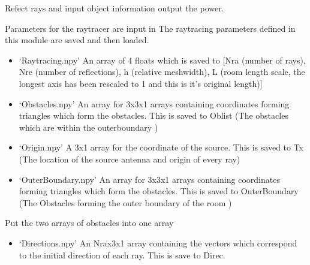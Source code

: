 \documentclass[letterpaper,10pt,english]{sphinxmanual}
\begin{document}
\begin{fulllineitems}
\label{\detokenize{index:RayTracerMainProgram.StdProgram}}
Refect rays and input object information output the power.

Parameters for the raytracer are input in {\hyperref[\detokenize{index:module-ParameterInput}]{}}
The raytracing parameters defined in this module are saved and then loaded.
\begin{itemize}
\item {} 
‘Raytracing.npy’ \sphinxhyphen{} An array of 4 floats which is saved to   {[}Nra (number of rays), Nre (number of reflections),   h (relative meshwidth),   L (room length scale, the longest axis has been rescaled to 1 and this   is it’s original length){]}

\item {} 
‘Obstacles.npy’  \sphinxhyphen{} An array for 3x3x1 arrays containing co\sphinxhyphen{}ordinates   forming triangles which form the obstacles. This is saved to Oblist   (The obstacles which are within the outerboundary )

\item {} 
‘Origin.npy’     \sphinxhyphen{} A 3x1 array for the co\sphinxhyphen{}ordinate of the source.   This is saved to Tx  (The location of the source antenna and origin   of every ray)

\item {} 
‘OuterBoundary.npy’ \sphinxhyphen{} An array for 3x3x1 arrays containing   co\sphinxhyphen{}ordinates forming triangles which form the obstacles. This is   saved to OuterBoundary   (The Obstacles forming the outer boundary of   the room )

\end{itemize}

Put the two arrays of obstacles into one array

\begin{sphinxVerbatim}[commandchars=\\\{\}]
\PYG{p}{[}\PYG{p}{]}
\end{sphinxVerbatim}
\begin{itemize}
\item {} 
‘Directions.npy’ \sphinxhyphen{} An Nrax3x1 array containing the vectors which   correspond to the initial direction of each ray. This is save to Direc.


\end{itemize}
\end{fulllineitems}
\end{document}
